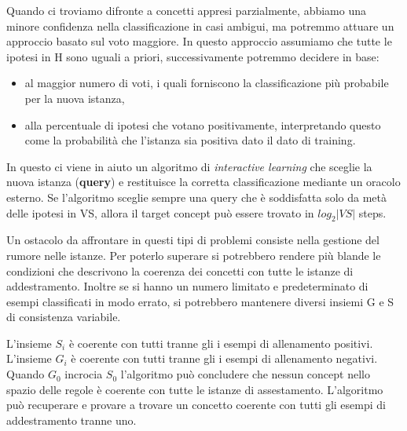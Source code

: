 \documentclass[a4paper]{extarticle}
\begin{document}
Quando ci troviamo difronte a concetti appresi parzialmente, abbiamo una minore confidenza nella classificazione in casi ambigui, ma potremmo attuare un approccio basato sul voto maggiore. In questo approccio assumiamo che tutte le ipotesi in H sono uguali a priori, successivamente potremmo decidere in base:

\begin{itemize}
\item al maggior numero di voti, i quali forniscono la classificazione più probabile per la nuova istanza,
\item alla percentuale di ipotesi che votano positivamente, interpretando questo come la probabilità che l'istanza sia positiva dato il dato di training.
\end{itemize}

In questo ci viene in aiuto un algoritmo di \textit{interactive learning} che sceglie la nuova istanza (\textbf{query}) e restituisce la corretta classificazione mediante un oracolo esterno. Se l'algoritmo sceglie sempre una query che è soddisfatta solo da metà delle ipotesi in VS, allora il target concept può essere trovato in $log_2 |VS|$ steps.

Un ostacolo da affrontare in questi tipi di problemi consiste nella gestione del rumore nelle istanze. Per poterlo superare si potrebbero rendere più blande le condizioni che descrivono la coerenza dei concetti con tutte le istanze di addestramento. Inoltre se si hanno un numero limitato e predeterminato di esempi classificati in modo errato, si potrebbero mantenere diversi insiemi G e S di consistenza variabile.

\begin{center}


\end{center}

L'insieme $S_i$ è coerente con tutti tranne gli i esempi di allenamento positivi. L'insieme $G_i$ è coerente con tutti tranne gli i esempi di allenamento negativi. Quando $G_0$ incrocia $S_0$ l'algoritmo può concludere che nessun concept nello spazio delle regole è coerente con tutte le istanze di assestamento. L'algoritmo può recuperare e provare a trovare un concetto coerente con tutti gli esempi di addestramento tranne uno.
\end{document}
